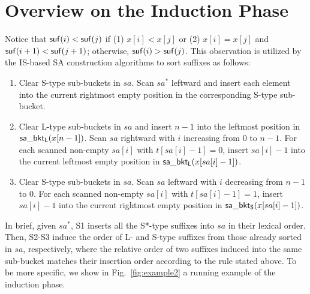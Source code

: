 \documentclass[10pt,journal,compsoc]{IEEEtran}
\begin{document}
\appendices
\section{Overview on the Induction Phase} \label{sec:appendix}

Notice that ${\sf suf}(i) < {\sf suf}(j)$ if (1) $x[i] < x[j]$ or (2) $x[i] = x[j]$ and ${\sf suf}(i + 1) < {\sf suf}(j + 1)$; otherwise, ${\sf suf}(i) > {\sf suf}(j)$. This observation is utilized by the IS-based SA construction algorithms to sort suffixes as follows:

\begin{enumerate}[S1]
	\item 
	Clear S-type sub-buckets in $sa$. Scan $sa^*$ leftward and insert each element into the current rightmost empty position in the corresponding S-type sub-bucket.
	
	\item 
	Clear L-type sub-buckets in $sa$ and insert $n - 1$ into the leftmost position in ${\sf sa\_bkt_L}(x[n - 1])$. Scan $sa$ rightward with $i$ increasing from $0$ to $n - 1$. For each scanned non-empty $sa[i]$ with $t[sa[i] - 1] = 0$, insert $sa[i] - 1$ into the current leftmost empty position in ${\sf sa\_bkt_L}(x[sa[i] - 1])$.
	
	\item
	Clear S-type sub-buckets in $sa$. Scan $sa$ leftward with $i$ decreasing from $n - 1$ to $0$. For each scanned non-empty $sa[i]$ with $t[sa[i] - 1] = 1$, insert $sa[i] - 1$ into the current rightmost empty position in ${\sf sa\_bkt_S}(x[sa[i] - 1])$.
	
\end{enumerate}

In brief, given $sa^*$, S1 inserts all the S*-type suffixes into $sa$ in their lexical order. Then, S2-S3 induce the order of L- and S-type suffixes from those already sorted in $sa$, respectively, where the relative order of two suffixes induced into the same sub-bucket matches their insertion order according to the rule stated above. To be more specific, we show in Fig.~\ref{fig:example2} a running example of the induction phase.
\end{document}
